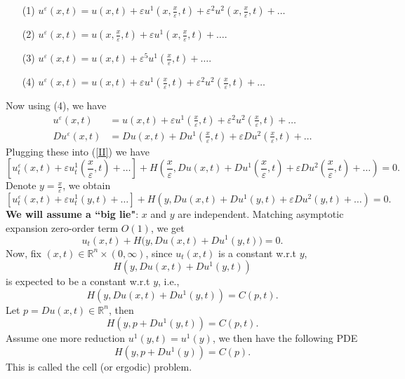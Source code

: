 \documentclass[12pt, oneside]{amsart}  	%
\begin{document}
\begin{itemize}
\item[(1)] $u^\varepsilon(x,t) = u(x,t)+\varepsilon u^1\left(x,\frac{x}{\varepsilon},t\right) + \varepsilon^2 u^2\left(x,\frac{x}{\varepsilon},t\right) + \ldots$ \vspace*{0.5cm}
\item[(2)] $u^\varepsilon(x,t) = u\left(x,\frac{x}{\varepsilon},t\right) + \varepsilon u^1\left(x,\frac{x}{\varepsilon},t\right) + \ldots$.
\vspace*{0.5cm}
\item[(3)] $u^\varepsilon(x,t) = u\left(x,t\right) + \varepsilon^5 u^1\left(\frac{x}{\varepsilon},t\right) + \ldots$. 
\vspace*{0.5cm}
\item[(4)] $u^\varepsilon(x,t) = u(x,t)+\varepsilon u^1\left(\frac{x}{\varepsilon},t\right) + \varepsilon^2 u^2\left(\frac{x}{\varepsilon},t\right) + \ldots$
\end{itemize}
Now using (4), we have
\begin{align*}
u^\varepsilon(x,t) &= u(x,t)+\varepsilon u^1\left(\frac{x}{\varepsilon},t\right) + \varepsilon^2 u^2\left(\frac{x}{\varepsilon},t\right) + \ldots \\
Du^\varepsilon(x,t) &= Du(x,t)+Du^1\left(\frac{x}{\varepsilon},t\right) + \varepsilon Du^2\left(\frac{x}{\varepsilon},t\right) + \ldots
\end{align*}
Plugging these into (\ref{II}) we have 
\begin{equation*}
\left[u_t^\varepsilon(x,t) + \varepsilon u^1_t\left(\frac{x}{\varepsilon},t\right) + \ldots \right] + H\left( \frac{x}{\varepsilon}, Du(x,t)+Du^1\left(\frac{x}{\varepsilon},t\right) + \varepsilon Du^2\left(\frac{x}{\varepsilon},t\right) + \ldots\right)=0.
\end{equation*}
Denote $y = \frac{x}{\varepsilon}$, we obtain
\begin{equation*}
\left[u_t^\varepsilon(x,t) + \varepsilon u^1_t\left(y,t\right) + \ldots \right] + H\left( y, Du(x,t)+Du^1\left(y,t\right) + \varepsilon Du^2\left(y,t\right) + \ldots\right)=0.
\end{equation*}
{ \textbf{We will assume a ``big lie"}:} $x$ and $y$ are independent. Matching asymptotic expansion zero-order term $O(1)$, we get
\begin{equation*}
u_t(x,t) + H\Big(y,Du(x,t) + Du^1(y,t)\Big) = 0.
\end{equation*}
Now, fix $(x,t)\in \mathbb{R}^n\times(0,\infty)$, since $u_t(x,t)$ is a constant w.r.t $y$, 
$$H(y,Du(x,t) + Du^1(y,t))$$
is expected to be a constant w.r.t $y$, i.e.,
\begin{equation*}
H(y,Du(x,t)+ Du^1(y,t)) = C(p,t).
\end{equation*}
Let $p= Du(x,t) \in \mathbb{R}^n$, then
\begin{equation*}
H(y,p+Du^1(y,t)) = C(p,t).
\end{equation*}
Assume one more reduction $u^1(y,t) = u^1(y)$, we then have the following PDE
\begin{equation*}
H(y, p+Du^1(y)) = C(p).
\end{equation*}
This is called the cell (or ergodic) problem.
\end{document}
